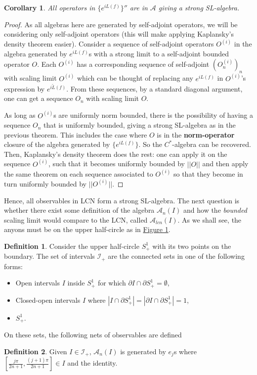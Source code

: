 \documentclass[twoside,11pt,titlepage]{amsart}
\renewcommand{\=}[1]{\stackrel{#1}{=}} %
\newtheorem{cor}[thm]{Corollary}
\theoremstyle{definition}
\newtheorem{dfn}{Definition}
\theoremstyle{remark}
\begin{document}
\begin{cor}\label{cor4.10}
All operators in $\{e^{iL(f)}\}''$ are in $\mathcal{A}$ giving a strong SL-algebra.
\end{cor}
\begin{proof}
As all algebras here are generated by self-adjoint operators, we will be considering only self-adjoint operators (this will make applying Kaplansky's density theorem easier). Consider a sequence of self-adjoint operators $O^{(i)}$ in the algebra generated by $e^{iL(f)}$s with a strong limit to a self-adjoint bounded operator $O$. Each $O^{(i)}$ has a corresponding sequence of self-adjoint $(O^{(i)}_n)_n$ with scaling limit $O^{(i)}$ which can be thought of replacing any $e^{iL(f)}$ in $O^{(i)}$'s expression by $e^{i\widetilde{L}(f)}$. From these sequences, by a standard diagonal argument, one can get a sequence $O_n$ with scaling limit $O$.

As long as $O^{(i)}$s are uniformly norm bounded, there is the possibility of having a sequence $O_n$ that is uniformly bounded, giving a strong SL-algebra as in the previous theorem. This includes the case where $O$ is in the \textbf{norm-operator} closure of the algebra generated by $\{e^{iL(f)}\}$. So the $C^*$-algebra can be recovered. Then, Kaplansky's density theorem does the rest: one can apply it on the sequence $O^{(i)}$, such that it becomes uniformly bounded by $||O||$ and then apply the same theorem on each sequence associated to $O^{(i)}$ so that they become in turn uniformly bounded by $||O^{(i)}||$.
\end{proof}

Hence, all observables in LCN form a strong SL-algebra. The next question is whether there exist some definition of the algebra $\mathcal{A}_n(I)$ and how the \textit{bounded} scaling limit would compare to the LCN, called $\mathcal{A}_{lcn}(I)$. As we shall see, the anyons must be on the upper half-circle as in \hyperref[fig1]{Figure 1}.
\begin{dfn}\label{dfn12}
Consider the upper half-circle $S^1_+$ with its two points on the boundary. The set of intervals $\mathcal{I}_+$ are the connected sets in one of the following forms:
\begin{itemize}
    \item Open intervals $I$ inside $S^1_+$ for which $\partial I \cap \partial S^1_+=\emptyset$,
    \item Closed-open intervals $I$ where $|I \cap \partial S^1_+| = |\partial I \cap \partial S^1_+|= 1$,
    \item $S^1_+$.
\end{itemize}
\end{dfn}
On these sets, the following nets of observables are defined
\begin{dfn}\label{dfn13}
Given $I \in \mathcal{I}_+$, $\mathcal{A}_n(I)$ is generated by $e_j$s where $[\frac{j\pi}{2n+1},\frac{(j+1)\pi}{2n+1}] \in I$ and the identity. 
\end{dfn}
\end{document}
